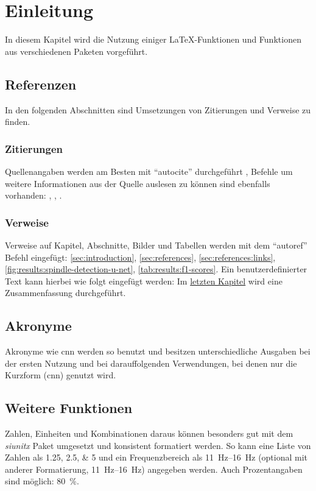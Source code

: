 \chapter{Einleitung} \label{sec:introduction}

In diesem Kapitel wird die Nutzung einiger \LaTeX{}-Funktionen und Funktionen aus verschiedenen Paketen vorgeführt.

\section{Referenzen} \label{sec:references}

In den folgenden Abschnitten sind Umsetzungen von Zitierungen und Verweise zu finden.

\subsection{Zitierungen}

Quellenangaben werden am Besten mit \enquote{autocite} durchgeführt \autocite{Mann1947}, Befehle um weitere Informationen aus der Quelle auslesen zu können sind ebenfalls vorhanden: \textcite{Mann1947}, \citeauthor{Mann1947}, .

\subsection{Verweise} \label{sec:references:links}

Verweise auf Kapitel, Abschnitte, Bilder und Tabellen werden mit dem \enquote{autoref} Befehl eingefügt: \autoref{sec:introduction}, \autoref{sec:references}, \autoref{sec:references:links}, \autoref{fig:results:spindle-detection-u-net}, \autoref{tab:results:f1-scores}.
Ein benutzerdefinierter Text kann hierbei wie folgt eingefügt werden: Im \hyperref[sec:summary]{letzten Kapitel} wird eine Zusammenfassung durchgeführt.

\section{Akronyme}

Akronyme wie \gls{cnn} werden so benutzt und besitzen unterschiedliche Ausgaben bei der ersten Nutzung und bei darauffolgenden Verwendungen, bei denen nur die Kurzform (\gls{cnn}) genutzt wird.

\section{Weitere Funktionen}

Zahlen, Einheiten und Kombinationen daraus können besonders gut mit dem \textit{siunitx} Paket umgesetzt und konsistent formatiert werden.
So kann \zB{} eine Liste von Zahlen als \numlist{1.25; 2.5; 5} und ein Frequenzbereich als \SIrange{11}{16}{\Hz} (optional mit anderer Formatierung, \zB{} \SIrange[range-phrase=--, range-units=single]{11}{16}{\Hz}) angegeben werden.
Auch Prozentangaben sind möglich: \SI{80}{\percent}.
